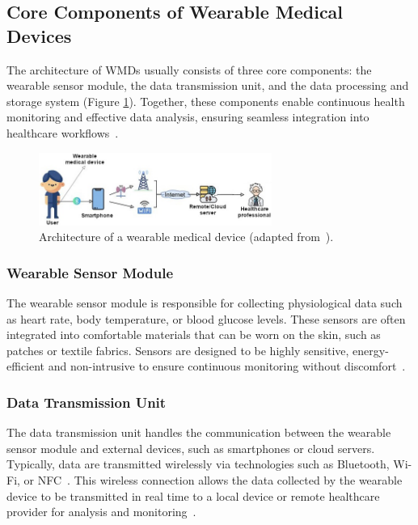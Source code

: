 \documentclass[journal]{IEEEtran}
\begin{document}
    \subsection{Core Components of Wearable Medical Devices}
    
    The architecture of WMDs usually consists of three core components: the wearable sensor module, the data transmission unit, and the data processing and storage system (Figure \ref{fig:architecture}). Together, these components enable continuous health monitoring and effective data analysis, ensuring seamless integration into healthcare workflows~\cite{Ates2022}.

    \begin{figure}[!t]
    \centering
    \includegraphics[width=3in]{Figuras/architecture.jpeg}
    \caption{Architecture of a wearable medical device (adapted from~\cite{Saifuzzaman2021}).}
    \label{fig:architecture}
    \end{figure}
    
        \subsubsection{Wearable Sensor Module}
        
        The wearable sensor module is responsible for collecting physiological data such as heart rate, body temperature, or blood glucose levels. These sensors are often integrated into comfortable materials that can be worn on the skin, such as patches or textile fabrics. Sensors are designed to be highly sensitive, energy-efficient and non-intrusive to ensure continuous monitoring without discomfort~\cite{Saifuzzaman2021}.
        
        \subsubsection{Data Transmission Unit}
        
        The data transmission unit handles the communication between the wearable sensor module and external devices, such as smartphones or cloud servers. Typically, data are transmitted wirelessly via technologies such as Bluetooth, Wi-Fi, or NFC~\cite{Guk2019}. This wireless connection allows the data collected by the wearable device to be transmitted in real time to a local device or remote healthcare provider for analysis and monitoring~\cite{Nahavandi2022}.
\end{document}
